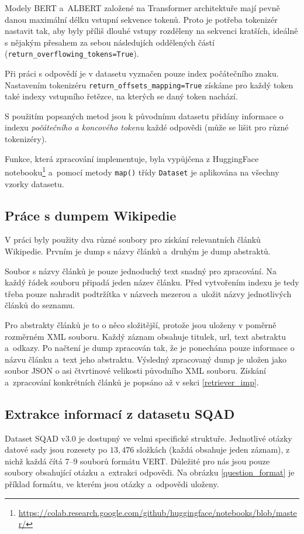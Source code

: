 Modely BERT a~ALBERT založené na Transformer architektuře mají pevně danou maximální délku vstupní sekvence tokenů. Proto je potřeba tokenizér nastavit tak, aby byly příliš dlouhé vstupy rozděleny na sekvenci kratších, ideálně s nějakým přesahem za sebou následujích oddělených částí (\texttt{return\_overflowing\_tokens=True}).\par
Při práci s odpovědí je v datasetu vyznačen pouze index počátečního znaku. Nastavením tokenizéru \texttt{return\_offsets\_mapping=True} získáme pro každý token také indexy vstupního řetězce, na kterých se daný token nachází.\par
S použitím popsaných metod jsou k původnímu datasetu přidány informace o indexu \emph{počátečního a koncového tokenu} každé odpovědi (může se lišit pro různé tokenizéry).\par 
Funkce, která zpracování implementuje, byla vypůjčena z HuggingFace notebooku\footnote{\url{https://colab.research.google.com/github/huggingface/notebooks/blob/master/}} a~pomocí metody \texttt{map()} třídy \texttt{Dataset} je aplikována na všechny vzorky datasetu.

\subsection{Práce s dumpem Wikipedie}
V práci byly použity dva různé soubory pro získání relevantních článků Wikipedie. Prvním je dump s názvy článků a~druhým je dump abstraktů.\par
Soubor s názvy článků je pouze jednoduchý text snadný pro zpracování. Na každý řádek souboru připadá jeden název článku. Před vytvořením indexu je tedy třeba pouze nahradit podtržítka v názvech mezerou a~uložit názvy jednotlivých článků do seznamu.\par
Pro abstrakty článků je to o něco složitější, protože jsou uloženy v poměrně rozměrném XML souboru. Každý záznam obsahuje titulek, url, text abstraktu a~odkazy. Po načtení je dump zpracován tak, že je ponechána pouze informace o názvu článku a~text jeho abstraktu. Výsledný zpracovaný dump je uložen jako soubor JSON o asi čtvrtinové velikosti původního XML souboru. Získání a~zpracování konkrétních článků je popsáno až v sekci \ref{retriever_imp}.

\subsection{Extrakce informací z datasetu SQAD}
Dataset SQAD v3.0 \cite{sqad_download} je dostupný ve velmi specifické struktuře. Jednotlivé otázky datové sady jsou rozesety po $13,476$ složkách (každá obsahuje jeden záznam), z nichž každá čítá \mbox{7--9} souborů formátu VERT. Důležité pro nás jsou pouze soubory obsahující otázku a~extrakci odpovědi. Na obrázku \ref{question_format} je příklad formátu, ve kterém jsou otázky a~odpovědi uloženy. 

